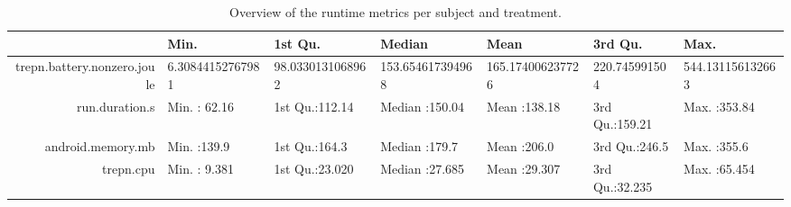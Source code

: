 \begin{table}[ht]
\centering
\begin{tabular}{rllllll}
  \hline
 & Min. & 1st Qu. & Median & Mean & 3rd Qu. & Max. \\ 
  \hline
trepn.battery.nonzero.joule & 6.30844152767981 & 98.0330131068962 & 153.654617394968 & 165.174006237726 & 220.745991504 & 544.131156132663 \\ 
  run.duration.s & Min.   : 62.16   & 1st Qu.:112.14   & Median :150.04   & Mean   :138.18   & 3rd Qu.:159.21   & Max.   :353.84   \\ 
  android.memory.mb & Min.   :139.9   & 1st Qu.:164.3   & Median :179.7   & Mean   :206.0   & 3rd Qu.:246.5   & Max.   :355.6   \\ 
    trepn.cpu & Min.   : 9.381   & 1st Qu.:23.020   & Median :27.685   & Mean   :29.307   & 3rd Qu.:32.235   & Max.   :65.454   \\ 
   \hline
\end{tabular}
\caption{Overview of the runtime metrics per subject and treatment.} 
\label{tab:results:rq1:summary:all}
\end{table}

